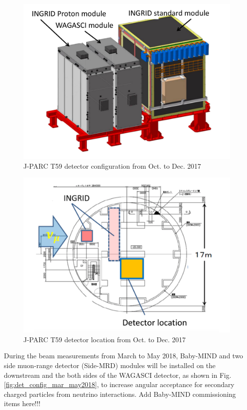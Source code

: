  \begin{figure}[tbh]
\begin{center}
\includegraphics[width=0.8\linewidth]{fig/t59_det_config_oct_dec_2017.pdf}
\end{center}
\caption{
J-PARC T59 detector configuration from Oct. to Dec. 2017
}
\label{fig:det_confg_oct_dec2017}
\end{figure}


\begin{figure}[tbh]
\begin{center}
\includegraphics[width=0.8\linewidth]{fig/t59_det_location_oct_dec_2017.pdf}
\end{center}
\caption{
J-PARC T59 detector location from Oct. to Dec. 2017
}
\label{fig:det_loc_oct_dec2017}
\end{figure}


During the beam measurements from March to May 2018, Baby-MIND and two side muon-range detector (Side-MRD) modules will be installed on the downstream and the both sides of the WAGASCI detector, as shown in Fig. \ref{fig:det_config_mar_may2018}, to increase angular acceptance for secondary charged particles from neutrino interactions.
Add Baby-MIND commissioning items here!!!
 
